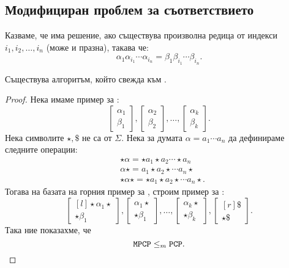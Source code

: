 \subsection*{Модифициран проблем за съответствието }

Казваме, че \MPCP има решение, ако съществува произволна редица от индекси $i_1,i_2,\dots,i_n$ (може и празна), такава че:
\[\alpha_1\alpha_{i_1}\cdots\alpha_{i_n} = \beta_1\beta_{i_1}\cdots\beta_{i_n}.\]

\begin{lemma}
  Съществува алгоритъм, който свежда \MPCP към \PCP.
\end{lemma}
\begin{proof}
  Нека имаме пример за \MPCP:
  \[\begin{bmatrix} \alpha_1\\ \beta_1\end{bmatrix},\begin{bmatrix} \alpha_2\\ \beta_2\end{bmatrix},\dots,\begin{bmatrix} \alpha_k\\ \beta_k\end{bmatrix} .\]
  Нека символите $\star,\$$ не са от $\Sigma$.
  Нека за думата $\alpha = a_1\cdots a_n$ да дефинираме следните операции:
  \begin{align*}
    & \star\alpha = \star a_1 \star a_2\cdots \star a_n\\
    & \alpha\star = a_1\star a_2\star\cdots a_n \star\\
    & \star\alpha\star = \star a_1\star a_2 \star \cdots a_n\star.
  \end{align*}
  Тогава на базата на горния пример за \MPCP, строим пример за \PCP:
  \[\begin{bmatrix*}[l] \star\alpha_1\star\\ \star\beta_1\end{bmatrix*},\begin{bmatrix} \alpha_1\star\\ \star \beta_1\end{bmatrix},\dots,\begin{bmatrix} \alpha_k\star\\ \star\beta_k\end{bmatrix},\begin{bmatrix*}[r] \$\\ \star\$\end{bmatrix*}.\]
  Така ние показахме, че
  \[\texttt{MPCP} \leq_m \texttt{PCP}.\]
\end{proof}


